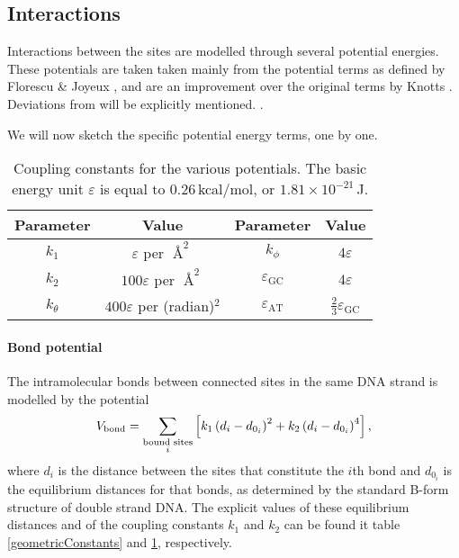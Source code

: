 \subsection{Interactions}

Interactions between the sites are modelled through several potential energies.
These potentials are taken taken mainly from the potential terms as defined by Florescu \& Joyeux \cite{florescu2011thermal}, and are an improvement over the original terms by Knotts \etal \cite{knotts2007coarse}. Deviations from \cite{florescu2011thermal} will be explicitly mentioned.
 .

We will now sketch the specific potential energy terms, one by one.

\begin{table}[hbt]
\begin{center}
\caption{Coupling constants for the various potentials. The basic energy unit $\varepsilon$ is equal to $0.26$\,kcal/mol, or $1.81 \times 10^{-21}$\,J.}

\begin{tabular}{cc||cc}
Parameter & Value & Parameter & Value\\\hline
$k_1$ & $\varepsilon$ per $\Angstrom^2$ &
	$k_\phi$ & $4\varepsilon$ \\
$k_2$ & $100\varepsilon$ per $\Angstrom^2$ &
	$\varepsilon_\text{GC}$ & $4\varepsilon$\\
$k_\theta$ & $400\varepsilon$ per (radian)$^2$ &
	$\varepsilon_\text{AT}$ & $\frac{2}{3} \varepsilon_\text{GC}$ \\
\end{tabular}\label{couplingConstants}
\end{center}
\end{table}


\paragraph{Bond potential}
The intramolecular bonds between connected sites in the same DNA strand is modelled by the potential
\begin{equation}
V_\text{bond}
= \sum_{\substack{\text{bound sites}\\i}} \left[
	k_1 \left(d_i - d_{0_i}\right)^2
	+ k_2 \left(d_i - d_{0_i}\right)^4
\right],
\end{equation}
where $d_i$ is the distance between the sites that constitute the $i$th bond and $d_{0_i}$ is the equilibrium distances for that bonds, as determined by the standard B-form structure of double strand DNA. The explicit values of these equilibrium distances and of the coupling constants $k_1$ and $k_2$ can be found it table \ref{geometricConstants} and \ref{couplingConstants}, respectively.


